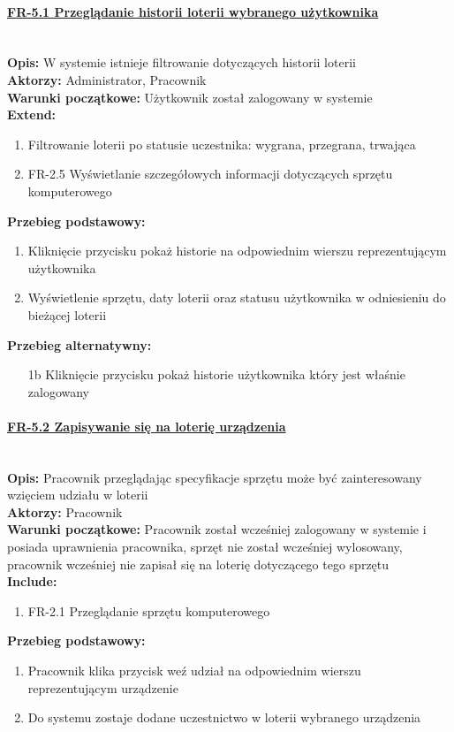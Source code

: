 \paragraph{\underline{FR-5.1 Przeglądanie historii loterii wybranego użytkownika}}\mbox{}\\[1mm]
	\noindent\textbf{Opis:} W systemie istnieje filtrowanie dotyczących historii loterii\\
	\noindent\textbf{Aktorzy:} Administrator, Pracownik\\
	\textbf{Warunki początkowe:} Użytkownik został zalogowany w systemie\\
	\textbf{Extend:} 
	\begin{enumerate}[noparskip]
		\item Filtrowanie loterii po statusie uczestnika: wygrana, przegrana, trwająca
		\item FR-2.5 Wyświetlanie szczegółowych informacji dotyczących sprzętu komputerowego
	\end{enumerate}
    \textbf{Przebieg podstawowy:}
	\begin{enumerate}[noparskip]
		\item Kliknięcie przycisku pokaż historie na odpowiednim wierszu reprezentującym użytkownika
		\item Wyświetlenie sprzętu, daty loterii oraz statusu użytkownika w odniesieniu do bieżącej loterii 
    \end{enumerate}
    \textbf{Przebieg alternatywny:}
	\begin{enumerate}[noparskip]
		\item [1b] Kliknięcie przycisku pokaż historie użytkownika który jest właśnie zalogowany
	\end{enumerate}

\paragraph{\underline{FR-5.2 Zapisywanie się na loterię urządzenia}}\mbox{}\\[1mm]
	\noindent\textbf{Opis:} Pracownik przeglądając specyfikacje sprzętu może być zainteresowany wzięciem udziału w loterii\\
	\noindent\textbf{Aktorzy:} Pracownik\\
	\textbf{Warunki początkowe:} Pracownik został wcześniej zalogowany w systemie i posiada uprawnienia pracownika, sprzęt nie został wcześniej wylosowany, pracownik wcześniej nie zapisał się na loterię dotyczącego tego sprzętu\\
	\textbf{Include:} 
	\begin{enumerate}[noparskip]
		\item FR-2.1 Przeglądanie sprzętu komputerowego
	\end{enumerate}
    \textbf{Przebieg podstawowy:}
	\begin{enumerate}[noparskip]
		\item Pracownik klika przycisk weź udział na odpowiednim wierszu reprezentującym urządzenie
		\item Do systemu zostaje dodane uczestnictwo w loterii wybranego urządzenia
    \end{enumerate}

